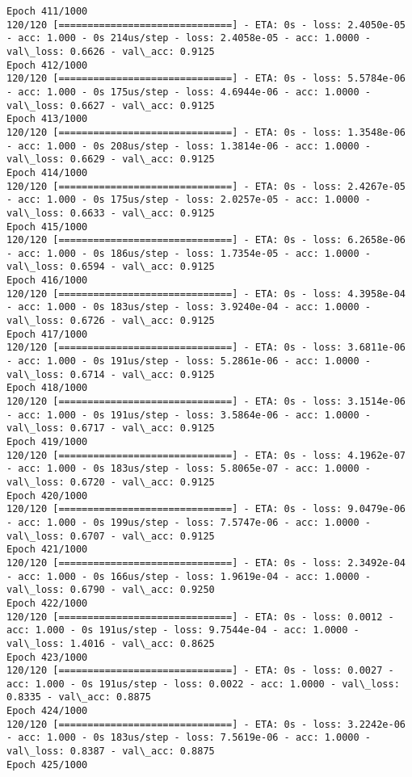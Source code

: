 \documentclass[11pt]{article}
\begin{document}
\begin{Verbatim}[commandchars=\\\{\}]
Epoch 411/1000
120/120 [==============================] - ETA: 0s - loss: 2.4050e-05 - acc: 1.000 - 0s 214us/step - loss: 2.4058e-05 - acc: 1.0000 - val\_loss: 0.6626 - val\_acc: 0.9125
Epoch 412/1000
120/120 [==============================] - ETA: 0s - loss: 5.5784e-06 - acc: 1.000 - 0s 175us/step - loss: 4.6944e-06 - acc: 1.0000 - val\_loss: 0.6627 - val\_acc: 0.9125
Epoch 413/1000
120/120 [==============================] - ETA: 0s - loss: 1.3548e-06 - acc: 1.000 - 0s 208us/step - loss: 1.3814e-06 - acc: 1.0000 - val\_loss: 0.6629 - val\_acc: 0.9125
Epoch 414/1000
120/120 [==============================] - ETA: 0s - loss: 2.4267e-05 - acc: 1.000 - 0s 175us/step - loss: 2.0257e-05 - acc: 1.0000 - val\_loss: 0.6633 - val\_acc: 0.9125
Epoch 415/1000
120/120 [==============================] - ETA: 0s - loss: 6.2658e-06 - acc: 1.000 - 0s 186us/step - loss: 1.7354e-05 - acc: 1.0000 - val\_loss: 0.6594 - val\_acc: 0.9125
Epoch 416/1000
120/120 [==============================] - ETA: 0s - loss: 4.3958e-04 - acc: 1.000 - 0s 183us/step - loss: 3.9240e-04 - acc: 1.0000 - val\_loss: 0.6726 - val\_acc: 0.9125
Epoch 417/1000
120/120 [==============================] - ETA: 0s - loss: 3.6811e-06 - acc: 1.000 - 0s 191us/step - loss: 5.2861e-06 - acc: 1.0000 - val\_loss: 0.6714 - val\_acc: 0.9125
Epoch 418/1000
120/120 [==============================] - ETA: 0s - loss: 3.1514e-06 - acc: 1.000 - 0s 191us/step - loss: 3.5864e-06 - acc: 1.0000 - val\_loss: 0.6717 - val\_acc: 0.9125
Epoch 419/1000
120/120 [==============================] - ETA: 0s - loss: 4.1962e-07 - acc: 1.000 - 0s 183us/step - loss: 5.8065e-07 - acc: 1.0000 - val\_loss: 0.6720 - val\_acc: 0.9125
Epoch 420/1000
120/120 [==============================] - ETA: 0s - loss: 9.0479e-06 - acc: 1.000 - 0s 199us/step - loss: 7.5747e-06 - acc: 1.0000 - val\_loss: 0.6707 - val\_acc: 0.9125
Epoch 421/1000
120/120 [==============================] - ETA: 0s - loss: 2.3492e-04 - acc: 1.000 - 0s 166us/step - loss: 1.9619e-04 - acc: 1.0000 - val\_loss: 0.6790 - val\_acc: 0.9250
Epoch 422/1000
120/120 [==============================] - ETA: 0s - loss: 0.0012 - acc: 1.000 - 0s 191us/step - loss: 9.7544e-04 - acc: 1.0000 - val\_loss: 1.4016 - val\_acc: 0.8625
Epoch 423/1000
120/120 [==============================] - ETA: 0s - loss: 0.0027 - acc: 1.000 - 0s 191us/step - loss: 0.0022 - acc: 1.0000 - val\_loss: 0.8335 - val\_acc: 0.8875
Epoch 424/1000
120/120 [==============================] - ETA: 0s - loss: 3.2242e-06 - acc: 1.000 - 0s 183us/step - loss: 7.5619e-06 - acc: 1.0000 - val\_loss: 0.8387 - val\_acc: 0.8875
Epoch 425/1000

\end{Verbatim}
\end{document}
